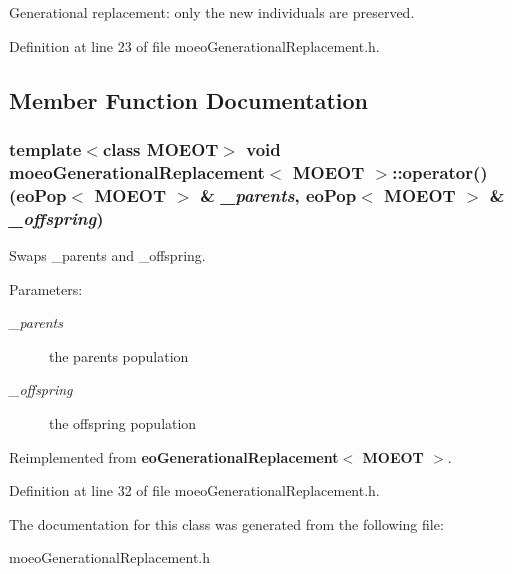 Generational replacement: only the new individuals are preserved. 



Definition at line 23 of file moeo\-Generational\-Replacement.h.

\subsection{Member Function Documentation}
\subsubsection{\setlength{\rightskip}{0pt plus 5cm}template$<$class MOEOT$>$ void {\bf moeo\-Generational\-Replacement}$<$ MOEOT $>$::operator() ({\bf eo\-Pop}$<$ MOEOT $>$ \& {\em \_\-parents}, {\bf eo\-Pop}$<$ MOEOT $>$ \& {\em \_\-offspring})\hspace{0.3cm}{\tt  [inline]}}\label{classmoeoGenerationalReplacement_7b8ac20d375820ba44a9f3dd4b95e120}


Swaps \_\-parents and \_\-offspring. 

\begin{Desc}
\item[Parameters:]
\begin{description}
\item[{\em \_\-parents}]the parents population \item[{\em \_\-offspring}]the offspring population \end{description}
\end{Desc}


Reimplemented from {\bf eo\-Generational\-Replacement$<$ MOEOT $>$}.

Definition at line 32 of file moeo\-Generational\-Replacement.h.

The documentation for this class was generated from the following file:\begin{CompactItemize}
\item 
moeo\-Generational\-Replacement.h\end{CompactItemize}
